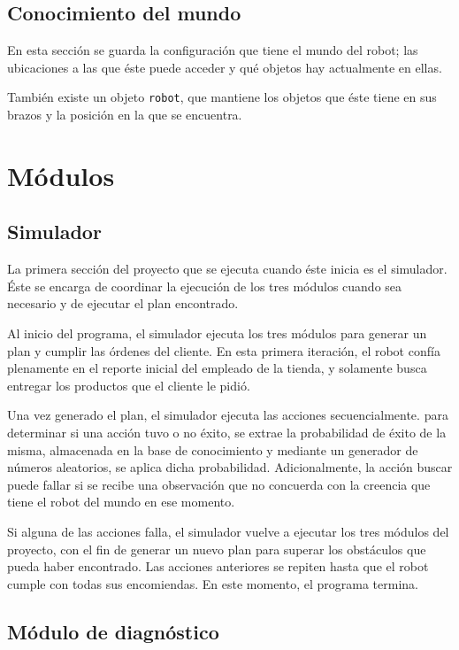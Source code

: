 \documentclass[11pt]{article}
\begin{document}
\subsection{Conocimiento del mundo}

En esta sección se guarda la configuración que tiene el mundo del robot; las ubicaciones a las que éste puede acceder y qué objetos hay actualmente en ellas.

También existe un objeto \texttt{robot}, que mantiene los objetos que éste tiene en sus brazos y la posición en la que se encuentra.

\section{Módulos}

\subsection{Simulador}

La primera sección del proyecto que se ejecuta cuando éste inicia es el simulador. Éste se encarga de coordinar la ejecución de los tres módulos cuando sea necesario y de ejecutar el plan encontrado.

Al inicio del programa, el simulador ejecuta los tres módulos para generar un plan y cumplir las órdenes del cliente. En esta primera iteración, el robot confía plenamente en el reporte inicial del empleado de la tienda, y solamente busca entregar los productos que el cliente le pidió.

Una vez generado el plan, el simulador ejecuta las acciones secuencialmente. para determinar si una acción tuvo o no éxito, se extrae la probabilidad de éxito de la misma, almacenada en la base de conocimiento y mediante un generador de números aleatorios, se aplica dicha probabilidad. Adicionalmente, la acción buscar puede fallar si se recibe una observación que no concuerda con la creencia que tiene el robot del mundo en ese momento.

Si alguna de las acciones falla, el simulador vuelve a ejecutar los tres módulos del proyecto, con el fin de generar un nuevo plan para superar los obstáculos que pueda haber encontrado. Las acciones anteriores se repiten hasta que el robot cumple con todas sus encomiendas. En este momento, el programa termina.

\subsection{Módulo de diagnóstico}
\end{document}
